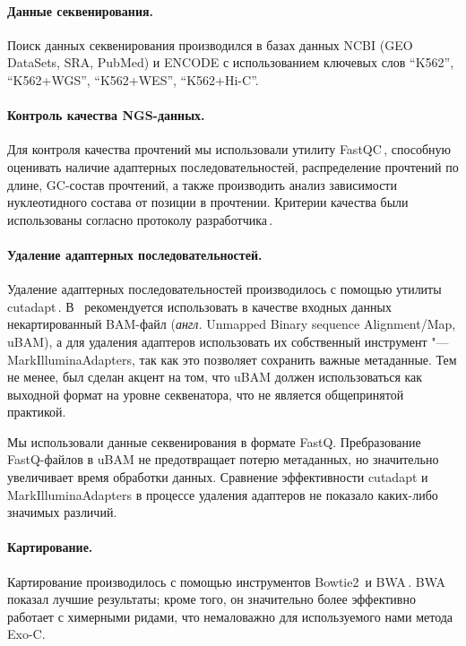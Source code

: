 \documentclass[a4paper,14pt]{extarticle}
\newcommand{\anglia}[1]{\textit{англ.} \textenglish{#1}}
\begin{document}
\paragraph{Данные секвенирования.}
Поиск данных секвенирования производился в базах данных NCBI (GEO DataSets, SRA, PubMed) и ENCODE с использованием ключевых слов ``K562'', ``K562+WGS'', ``K562+WES'', ``K562+Hi-C''.

\paragraph{Контроль качества NGS\hyp{}данных.}
Для контроля качества прочтений мы использовали утилиту FastQC\,\cite{FastQC}, способную оценивать наличие адаптерных последовательностей, распределение прочтений по длине, GC-состав прочтений, а также производить анализ зависимости нуклеотидного состава от позиции в прочтении.
Критерии качества были использованы согласно протоколу разработчика\,\cite{FastQC}.

\paragraph{Удаление адаптерных последовательностей.}
Удаление адаптерных последовательностей производилось с помощью утилиты cutadapt\,\cite{Martin_2011}.
В \,\cite{Auwera_2013} рекомендуется использовать в качестве входных данных некартированный BAM-файл (\anglia{Unmapped Binary sequence Alignment/Map, uBAM}), а для удаления адаптеров использовать их собственный инструмент "--- MarkIlluminaAdapters, так как это позволяет сохранить важные метаданные.
Тем не менее, был сделан акцент на том, что uBAM должен использоваться как выходной формат на уровне секвенатора, что не является общепринятой практикой.

Мы использовали данные секвенирования в формате FastQ.
Пребразование FastQ-файлов в uBAM не предотвращает потерю метаданных, но значительно увеличивает время обработки данных.
Сравнение эффективности cutadapt и MarkIlluminaAdapters в процессе удаления адаптеров не показало каких-либо значимых различий.

\paragraph{Картирование.}
Картирование производилось с помощью инструментов Bowtie2\,\cite{Langmead_2012} и BWA\,\cite{Li_2009}.
BWA показал лучшие результаты;
кроме того, он значительно более эффективно работает с химерными ридами, что немаловажно для используемого нами метода Exo-C.
\end{document}
